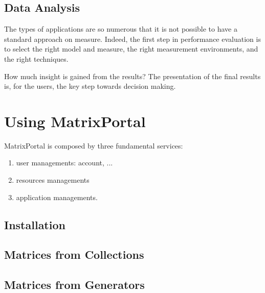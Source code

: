 \documentclass[11pt,relax]{SANDreport}
\begin{document}
\subsection{Data Analysis}

The types of applications
are so numerous that it is not possible to have a standard approach on
measure. Indeed, the first step in performance evaluation is to select the
right model and measure, the right measurement environments, and the right
techniques.

How much insight is gained from the results? The presentation of the final
results is, for the users, the key step towards decision making. 

\section{Using MatrixPortal}

MatrixPortal is composed by three fundamental services:
\begin{enumerate}
\item user managements: account, ...
\item resources managements
\item application managements.
\end{enumerate}

\subsection{Installation}

\subsection{Matrices from Collections}

\subsection{Matrices from Generators}
\end{document}

